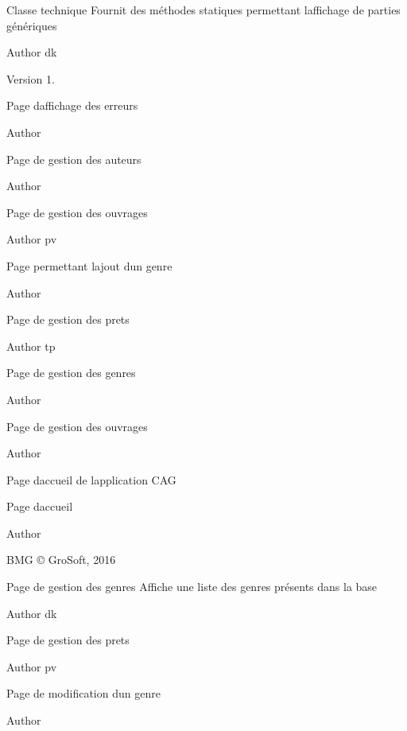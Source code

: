 Classe technique Fournit des méthodes statiques permettant l\textquotesingle{}affichage de parties génériques

\begin{DoxyAuthor}{Author}
dk 
\end{DoxyAuthor}
\begin{DoxyVersion}{Version}
1.
\end{DoxyVersion}
Page d\textquotesingle{}affichage des erreurs \begin{DoxyAuthor}{Author}

\end{DoxyAuthor}
Page de gestion des auteurs

\begin{DoxyAuthor}{Author}

\end{DoxyAuthor}
Page de gestion des ouvrages \begin{DoxyAuthor}{Author}
pv
\end{DoxyAuthor}
Page permettant l\textquotesingle{}ajout d\textquotesingle{}un genre \begin{DoxyAuthor}{Author}

\end{DoxyAuthor}
Page de gestion des prets

\begin{DoxyAuthor}{Author}
tp
\end{DoxyAuthor}
Page de gestion des genres \begin{DoxyAuthor}{Author}

\end{DoxyAuthor}
Page de gestion des ouvrages \begin{DoxyAuthor}{Author}

\end{DoxyAuthor}
Page d\textquotesingle{}accueil de l\textquotesingle{}application C\+AG

Page d\textquotesingle{}accueil \begin{DoxyAuthor}{Author}

\end{DoxyAuthor}
B\+MG © Gro\+Soft, 2016

Page de gestion des genres Affiche une liste des genres présents dans la base \begin{DoxyAuthor}{Author}
dk
\end{DoxyAuthor}
Page de gestion des prets

\begin{DoxyAuthor}{Author}
pv
\end{DoxyAuthor}
Page de modification d\textquotesingle{}un genre \begin{DoxyAuthor}{Author}

\end{DoxyAuthor}
